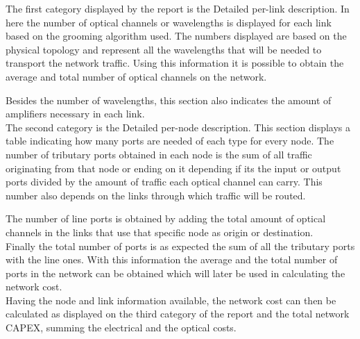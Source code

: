 	The first category displayed by the report is the Detailed per-link description. In here the number of optical channels or wavelengths is displayed for each link based on the grooming algorithm used. The numbers displayed are based on the physical topology and represent all the wavelengths that will be needed to transport the network traffic. Using this information it is possible to obtain the average and total number of optical channels on the network.
	
	Besides the number of wavelengths, this section also indicates the amount of amplifiers necessary in each link. \\
	
	The second category is the Detailed per-node description. This section displays a table indicating how many ports are needed of each type for every node. The number of tributary ports obtained in each node is the sum of all traffic originating from that node or ending on it depending if its the input or output ports divided by the amount of traffic each optical channel can carry. This number also depends on the links through which traffic will be routed. %
	
	The number of line ports is obtained by adding the total amount of optical channels in the links that use that specific node as origin or destination.\\
	
	Finally the total number of ports is as expected the sum of all the tributary ports with the line ones. With this information the average and the total number of ports in the network can be obtained which will later be used in calculating the network cost.\\
	
	Having the node and link information available, the network cost can then be calculated as displayed on the third category of the report and the total network CAPEX, summing the electrical and the optical costs.							

	
	
